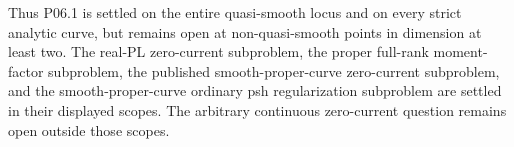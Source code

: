Thus P06.1 is settled on the entire quasi-smooth locus and on every strict
analytic curve, but remains open at non-quasi-smooth points in dimension at
least two.  The real-PL zero-current subproblem, the proper full-rank moment-factor
subproblem, the published smooth-proper-curve zero-current subproblem, and
the smooth-proper-curve ordinary psh regularization subproblem are settled in
their displayed scopes.  The arbitrary continuous zero-current question
remains open outside those scopes.
